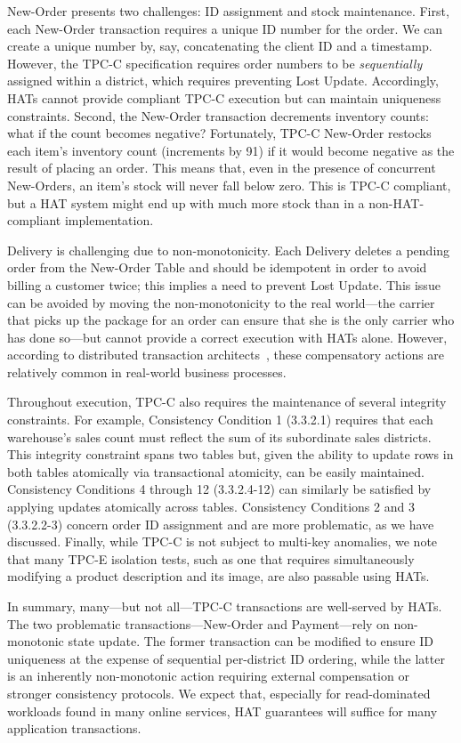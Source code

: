 New-Order presents two challenges: ID assignment and stock
maintenance. First, each New-Order transaction requires a unique ID
number for the order. We can create a unique number by, say,
concatenating the client ID and a timestamp. However, the TPC-C
specification requires order numbers to be \textit{sequentially}
assigned within a district, which requires preventing Lost
Update. Accordingly, HATs cannot provide compliant TPC-C execution but
can maintain uniqueness constraints. Second, the New-Order transaction
decrements inventory counts: what if the count becomes negative?
Fortunately, TPC-C New-Order restocks each item's inventory count
(increments by 91) if it would become negative as the result of
placing an order. This means that, even in the presence of concurrent
New-Orders, an item's stock will never fall below zero. This is TPC-C
compliant, but a HAT system might end up with much more stock
than in a non-HAT-compliant implementation.

Delivery is challenging due to non-monotonicity. Each Delivery deletes
a pending order from the New-Order Table and should be idempotent in
order to avoid billing a customer twice; this implies a need to
prevent Lost Update. This issue  can be avoided  by moving the
non-monotonicity to the real world---the carrier that picks up the
package for an order can ensure that she is the only carrier who has
done so---but cannot provide a correct execution with HATs
alone. However, according to distributed transaction
architects~\cite{entitygroup}, these compensatory actions are
relatively common in real-world business processes.

Throughout execution, TPC-C also requires the maintenance of several
integrity constraints. For example, Consistency Condition 1 (3.3.2.1)
requires that each warehouse's sales count must reflect the sum of its
subordinate sales districts. This integrity constraint spans two
tables but, given the ability to update rows in both tables atomically
via transactional atomicity, can be easily maintained. Consistency
Conditions 4 through 12 (3.3.2.4-12) can similarly be satisfied by
applying updates atomically across tables. Consistency Conditions 2
and 3 (3.3.2.2-3) concern order ID assignment and are more
problematic, as we have discussed.  Finally, while TPC-C is not
subject to multi-key anomalies, we note that many TPC-E isolation
tests, such as one that requires simultaneously modifying a product
description and its image, are also passable using HATs.

In summary, many---but not all---TPC-C transactions are well-served by
HATs. The two problematic transactions---New-Order and Payment---rely
on non-monotonic state update. The former transaction can be modified
to ensure ID uniqueness at the expense of sequential per-district ID
ordering, while the latter is an inherently non-monotonic action
requiring external compensation or stronger consistency protocols. We
expect that, especially for read-dominated workloads found in many
online services, HAT guarantees will suffice for many application
transactions.

